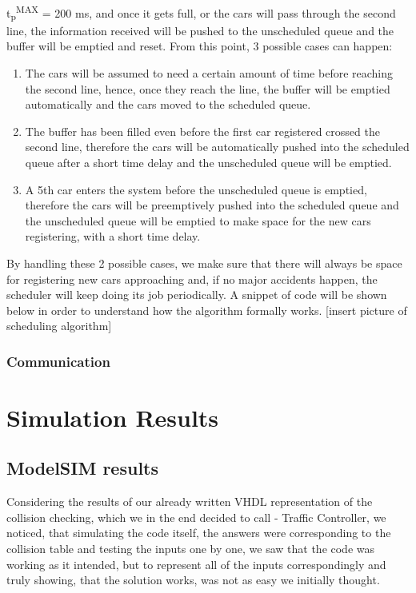 \documentclass[conference]{IEEEtran}
\begin{document}
t\textsubscript{p}\textsuperscript{MAX} = 200 ms, and once it gets full, or the cars will pass through the second line, the information received will be pushed to the unscheduled queue and the buffer will be emptied and reset. From this point, 3 possible cases can happen:

\begin{enumerate}
\item The cars will be assumed to need a certain amount of time before reaching the second line, hence, once they reach the line, the buffer will be emptied automatically and the cars moved to the scheduled queue.

\item The buffer has been filled even before the first car registered crossed the second line, therefore the cars will be automatically pushed into the scheduled queue after a short time delay and the unscheduled queue will be emptied.

\item A 5th car enters the system before the unscheduled queue is emptied, therefore the cars will be preemptively pushed into the scheduled queue and the unscheduled queue will be emptied to make space for the new cars registering, with a short time delay.
\end{enumerate}

By handling these 2 possible cases, we make sure that there will always be space for registering new cars approaching and, if no major accidents happen, the scheduler will keep doing its job periodically.
A snippet of code will be shown below in order to understand how the algorithm formally works.
[insert picture of scheduling algorithm]

\subsubsection{Communication}



\section{Simulation Results}

\subsection{ModelSIM results}

Considering the results of our already written VHDL representation of the collision checking, which we in the end decided to call - Traffic Controller, we noticed, that simulating the code itself, the answers were corresponding to the collision table and testing the inputs one by one, we saw that the code was working as it intended, but to represent all of the inputs correspondingly and truly showing, that the solution works, was not as easy we initially thought.
\end{document}
